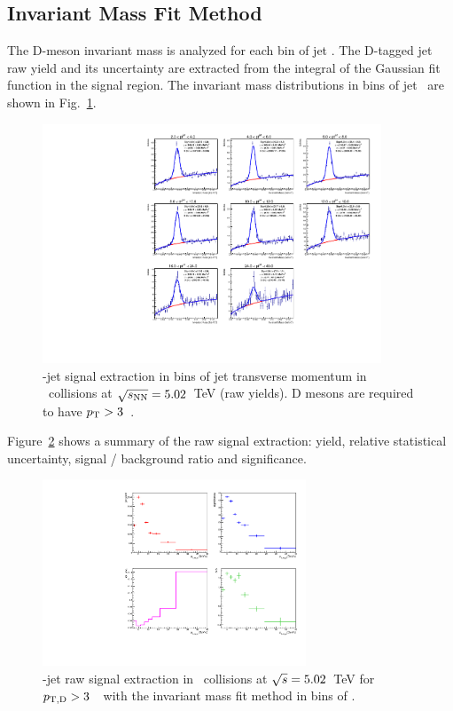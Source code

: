 \subsection{Invariant Mass Fit Method}
\label{sect:InvMassFit}

The D-meson invariant mass is analyzed for each bin of jet \pt. The D-tagged jet raw yield and its uncertainty are extracted from the integral of the Gaussian fit function in the signal region.
The invariant mass distributions in bins of jet \pt\ are shown in Fig.~\ref{fig:eq_pPb_InvMass}.

\begin{figure}[bth]
\centering
\includegraphics[width=0.9\textwidth]{pPbplots/plotsEffScale_noEff_pt3_noDetails/invMass_FASTwoSDD}
\caption{\Dstar-jet signal extraction in bins of jet transverse momentum in \pPb\ collisions at $\sqrt{s_{\rm NN}}=5.02$~TeV (raw yields). D mesons are required to have $p_{\rm T}>3$~\GeVc.}
\label{fig:eq_pPb_InvMass}
\end{figure}

Figure~\ref{fig:eq_pPb_RSU_raw} shows a summary of the raw signal extraction: yield, relative statistical uncertainty, signal / background ratio and significance.

\begin{figure}[bth]
\centering
\includegraphics[width=0.7\textwidth]{pPbplots/plotsEffScale_noEff_pt3_noDetails/signalParams_FASTwoSDD}
\caption{\Dstar-jet raw signal extraction in \pPb\ collisions at $\sqrt{s}=5.02$~TeV for $p_{\mathrm{T,D}}>3$~\GeVc\ with the invariant mass fit method in bins of \ptchjet.}
\label{fig:eq_pPb_RSU_raw}
\end{figure}

